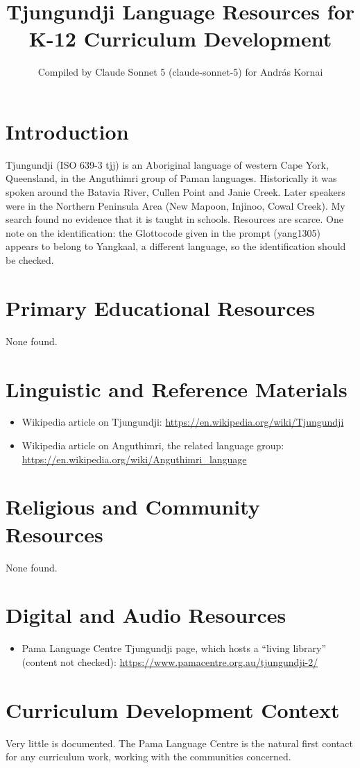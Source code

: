 \documentclass[12pt]{article}
\title{Tjungundji Language Resources for K-12 Curriculum Development}
\author{Compiled by Claude Sonnet 5 (claude-sonnet-5) for Andr\'as Kornai}
\date{}
\begin{document}
\maketitle
\section{Introduction}
Tjungundji (ISO 639-3 tjj) is an Aboriginal language of western Cape York, Queensland, in the Anguthimri group of Paman languages. Historically it was spoken around the Batavia River, Cullen Point and Janie Creek. Later speakers were in the Northern Peninsula Area (New Mapoon, Injinoo, Cowal Creek). My search found no evidence that it is taught in schools. Resources are scarce. One note on the identification: the Glottocode given in the prompt (yang1305) appears to belong to Yangkaal, a different language, so the identification should be checked.
\section{Primary Educational Resources}
None found.
\section{Linguistic and Reference Materials}
\begin{itemize}
\item Wikipedia article on Tjungundji: \url{https://en.wikipedia.org/wiki/Tjungundji}
\item Wikipedia article on Anguthimri, the related language group: \url{https://en.wikipedia.org/wiki/Anguthimri_language}
\end{itemize}
\section{Religious and Community Resources}
None found.
\section{Digital and Audio Resources}
\begin{itemize}
\item Pama Language Centre Tjungundji page, which hosts a ``living library'' (content not checked): \url{https://www.pamacentre.org.au/tjungundji-2/}
\end{itemize}
\section{Curriculum Development Context}
Very little is documented. The Pama Language Centre is the natural first contact for any curriculum work, working with the communities concerned.
\end{document}
